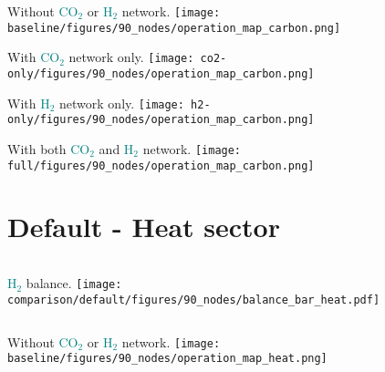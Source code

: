 \documentclass[12pt, aspectratio=169]{beamer}
\newcommand{\carbon}{\textcolor{teal}{CO$_2$}}
\newcommand{\hydrogen}{\textcolor{teal}{H$_2$}}
\begin{document}
\begin{frame}
    \begin{center}
    Without \carbon{} or \hydrogen{} network.
    \texttt{[image: baseline/figures/90\_nodes/operation\_map\_carbon.png]}
    \end{center}
\end{frame}


\begin{frame}
    \begin{center}
    With \carbon{} network only.
    \texttt{[image: co2-only/figures/90\_nodes/operation\_map\_carbon.png]}
    \end{center}
\end{frame}

\begin{frame}
    \begin{center}
    With \hydrogen{} network only.
    \texttt{[image: h2-only/figures/90\_nodes/operation\_map\_carbon.png]}
    \end{center}
\end{frame}


\begin{frame}
    \begin{center}
    With both \carbon{}  and \hydrogen{} network.
    \texttt{[image: full/figures/90\_nodes/operation\_map\_carbon.png]}
    \end{center}
\end{frame}





\section*{Default - Heat sector}

\begin{frame}
    \begin{columns}
        \hydrogen{} balance.
        \texttt{[image: comparison/default/figures/90\_nodes/balance\_bar\_heat.pdf]}
    \end{columns}
\end{frame}


\begin{frame}
    \begin{center}
    Without \carbon{} or \hydrogen{} network.
    \texttt{[image: baseline/figures/90\_nodes/operation\_map\_heat.png]}
    \end{center}
\end{frame}
\end{document}
